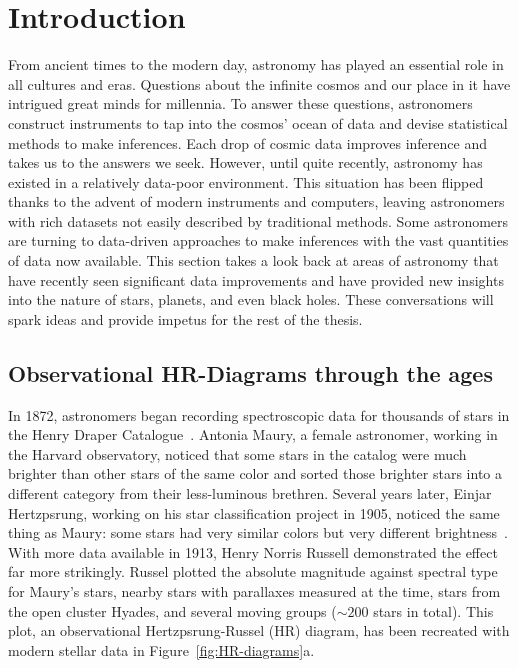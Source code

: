  \chapter{Introduction}
\label{cp.intro}

From ancient times to the modern day, astronomy has played an essential role in all cultures and eras.
Questions about the infinite cosmos and our place in it have intrigued great minds for millennia.
To answer these questions, astronomers construct instruments to tap into the cosmos' ocean of data and devise statistical methods to make inferences.
Each drop of cosmic data improves inference and takes us to the answers we seek.
However, until quite recently, astronomy has existed in a relatively data-poor environment. 
This situation has been flipped thanks to the advent of modern instruments and computers, leaving astronomers with rich datasets not easily described by traditional methods.
Some astronomers are turning to data-driven approaches to make inferences with the vast quantities of data now available.
This section takes a look back at areas of astronomy that have recently seen significant data improvements and have provided new insights into the nature of stars, planets, and even black holes.
These conversations will spark ideas and provide impetus for the rest of the thesis.



\section{Observational HR-Diagrams through the ages}

In 1872, astronomers began recording spectroscopic data for thousands of stars in the Henry Draper Catalogue~\citeme.
Antonia Maury, a female astronomer, working in the Harvard observatory, noticed that some stars in the catalog were much brighter than other stars of the same color and sorted those brighter stars into a different category from their less-luminous brethren. 
Several years later, Einjar Hertzpsrung, working on his star classification project in 1905, noticed the same thing as Maury: some stars had very similar colors but very different brightness~\citeme.
With more data available in 1913, Henry Norris Russell demonstrated the effect far more strikingly. 
Russel plotted the absolute magnitude against spectral type for Maury's stars, nearby stars with parallaxes measured at the time, stars from the open cluster Hyades, and several moving groups ($\sim200$ stars in total). 
This plot, an observational Hertzpsrung-Russel (HR) diagram, has been recreated with modern stellar data in Figure~\ref{fig:HR-diagrams}a.

